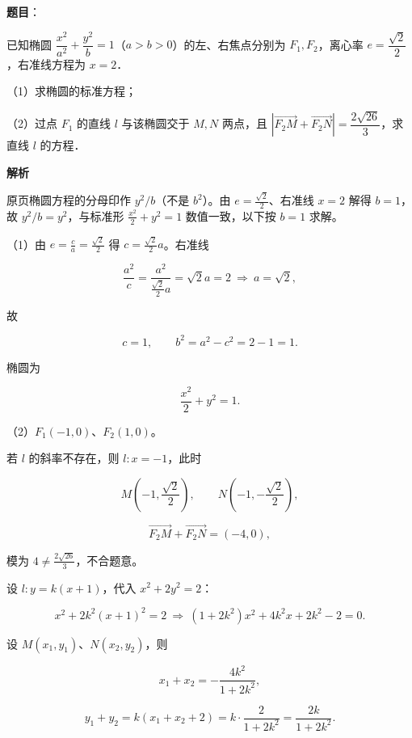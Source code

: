 \begin{answer}

\textbf{题目}：

已知椭圆 $\dfrac{x^2}{a^2}+\dfrac{y^2}{b}=1$（$a>b>0$）的左、右焦点分别为 $F_1,F_2$，离心率 $e=\dfrac{\sqrt2}{2}$，右准线方程为 $x=2$．

（1）求椭圆的标准方程；

（2）过点 $F_1$ 的直线 $l$ 与该椭圆交于 $M,N$ 两点，且 $\left|\overrightarrow{F_2M}+\overrightarrow{F_2N}\right|=\dfrac{2\sqrt{26}}{3}$，求直线 $l$ 的方程．

\textbf{解析}

\begin{gktip}
原页椭圆方程的分母印作 $y^2/b$（不是 $b^2$）。由 $e=\frac{\sqrt2}{2}$、右准线 $x=2$ 解得 $b=1$，故 $y^2/b=y^2$，与标准形 $\frac{x^2}{2}+y^2=1$ 数值一致，以下按 $b=1$ 求解。
\end{gktip}

（1）由 $e=\frac ca=\frac{\sqrt2}{2}$ 得 $c=\frac{\sqrt2}{2}a$。右准线

\nopagebreak[4]
\[\frac{a^2}{c}=\frac{a^2}{\frac{\sqrt2}{2}a}=\sqrt2a=2\ \Longrightarrow\ a=\sqrt2,\]

故

\nopagebreak[4]
\[c=1,\qquad b^2=a^2-c^2=2-1=1 .\]

椭圆为

\nopagebreak[4]
\[\frac{x^2}{2}+y^2=1 .\]

（2）$F_1(-1,0)$、$F_2(1,0)$。

若 $l$ 的斜率不存在，则 $l:x=-1$，此时

\nopagebreak[4]
\[M\left(-1,\frac{\sqrt2}{2}\right),\qquad N\left(-1,-\frac{\sqrt2}{2}\right),\]

\nopagebreak[4]
\[\overrightarrow{F_2M}+\overrightarrow{F_2N}=(-4,0),\]

模为 $4\neq\frac{2\sqrt{26}}{3}$，不合题意。

设 $l:y=k(x+1)$，代入 $x^2+2y^2=2$：

\nopagebreak[4]
\[x^2+2k^2(x+1)^2=2\ \Longrightarrow\ (1+2k^2)x^2+4k^2x+2k^2-2=0 .\]

设 $M(x_1,y_1)$、$N(x_2,y_2)$，则

\nopagebreak[4]
\[x_1+x_2=-\frac{4k^2}{1+2k^2},\]

\nopagebreak[4]
\[y_1+y_2=k(x_1+x_2+2)=k\cdot\frac{2}{1+2k^2}=\frac{2k}{1+2k^2}.\]


\end{answer}
